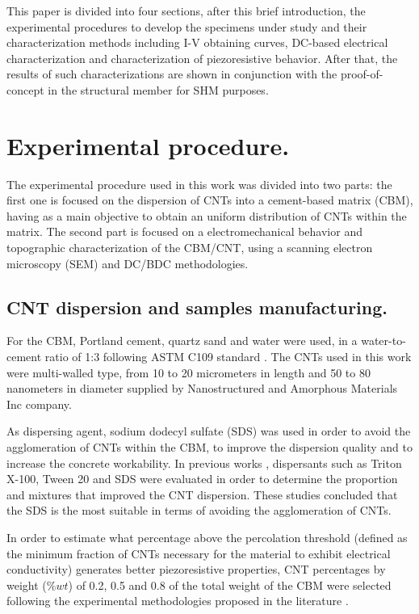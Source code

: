 \documentclass[twocolumn]{bmcart}%
\begin{document}
This paper is divided into four sections, after this brief introduction, the experimental procedures to develop the specimens under study and their characterization methods including I-V obtaining curves, DC-based electrical characterization and characterization of piezoresistive behavior. After that, the results of such characterizations are shown in conjunction with the proof-of-concept in the structural member for SHM purposes.


\section{Experimental procedure.} \label{Experimental_procedure}

The experimental procedure used in this work was divided into two parts: the first one is focused on the dispersion of CNTs into a cement-based matrix (CBM), having as a main objective to obtain an uniform distribution of CNTs within the matrix. The second part is focused on a electromechanical behavior  and topographic characterization of the CBM/CNT, using a scanning electron microscopy (SEM) and DC/BDC methodologies. 

\subsection{CNT dispersion and samples manufacturing.} \label{materials}

For the CBM, Portland cement, quartz sand and water were used, in a water-to-cement ratio of 1:3 following ASTM C109 standard \cite{ASTMC1092000}. The CNTs used in this work were multi-walled type, from 10 to 20 micrometers in length and 50 to 80 nanometers in diameter supplied by Nanostructured and Amorphous Materials Inc company.

As dispersing agent, sodium dodecyl sulfate (SDS) was used in order to avoid the agglomeration of CNTs within the CBM, to improve the dispersion quality and to increase the concrete workability. In previous works \cite{Castaneda-Saldarriaga2019, Kyrylyuk2008, Shao2017, Myung2014, Sasmal2017, Rehman2018}, dispersants such as Triton X-100, Tween 20 and SDS were evaluated in order to determine the proportion and mixtures that improved the CNT dispersion. These studies concluded that the SDS is the most suitable in terms of avoiding the agglomeration of CNTs.

In order to estimate what percentage above the percolation threshold (defined as the minimum fraction of CNTs necessary for the material to exhibit electrical conductivity) generates better piezoresistive properties, CNT percentages by weight ($\%wt$) of 0.2, 0.5 and 0.8 of the total weight of the CBM were selected following the experimental methodologies proposed in the literature \cite{Coppola2011, Downey2017a, Cui2013, Garcia-Macias2017, Baeza2013a, Yoo2018a}. 
\end{document}
